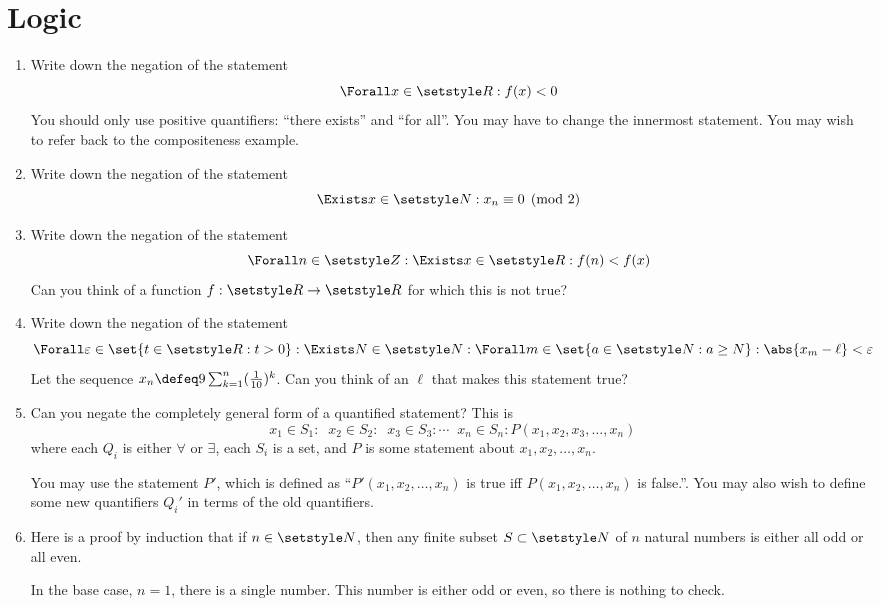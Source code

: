 \section{Logic}

\begin{enumerate}
 \item
  Write down the negation of the statement
  \begin{equation*}
   \Forall x \in \Reals: f(x) < 0
  \end{equation*}
  You should only use positive quantifiers: ``there exists'' and ``for all''.
  You may have to change the innermost statement. You may wish to refer back to
  the compositeness example.
 \item
  Write down the negation of the statement
  \begin{equation*}
   \Exists x \in \Naturals : x_n \equiv 0 \pmod 2
  \end{equation*}
 \item
  Write down the negation of the statement
  \begin{equation*}
   \Forall n \in \Integers :
   \Exists x \in \Reals :
   f(n) < f(x)
  \end{equation*}
  Can you think of a function \(f : \Reals \to \Reals\) for which this is not
  true?
 \item
  Write down the negation of the statement
  \begin{equation*}
   \Forall \epsilon \in \set{t \in \Reals: t > 0} :
   \Exists N \in \Naturals :
   \Forall m \in \set{a \in \Naturals : a \ge N}:
   \abs{x_m - \ell} < \epsilon
  \end{equation*}
  Let the sequence \(x_n \defeq 9\sum_{k = 1}^n(\frac 1{10})^k\). Can you think
  of an \(\ell\) that makes this statement true?
 \item
  Can you negate the completely general form of a quantified statement? This is
  \begin{equation*}
   \mathop{Q_1} x_1 \in S_1 :
   \mathop{Q_2} x_2 \in S_2 :
   \mathop{Q_3} x_3 \in S_3 :
   \dotsb
   \mathop{Q_n} x_n \in S_n :
   P(x_1, x_2, x_3, \dotsc, x_n)
  \end{equation*}
  where each \(Q_i\) is either \(\forall\) or \(\exists\), each \(S_i\) is a
  set, and \(P\) is some statement about \(x_1, x_2, \dotsc, x_n\).

  You may use the statement \(P'\), which is defined as
  ``\(P'(x_1, x_2, \dotsc, x_n)\) is true iff \(P(x_1, x_2, \dotsc, x_n)\) is
  false.''. You may also wish to define some new quantifiers \(Q_i'\) in terms
  of the old quantifiers.
 \item
  Here is a proof by induction that if \(n \in \Naturals\), then any finite
  subset \(S \subset \Naturals\) of \(n\) natural numbers is either all odd or
  all even.
  \begin{tcolorbox}
   In the base case, \(n = 1\), there is a single number. This number is either
   odd or even, so there is nothing to check.


\end{tcolorbox}
\end{enumerate}
